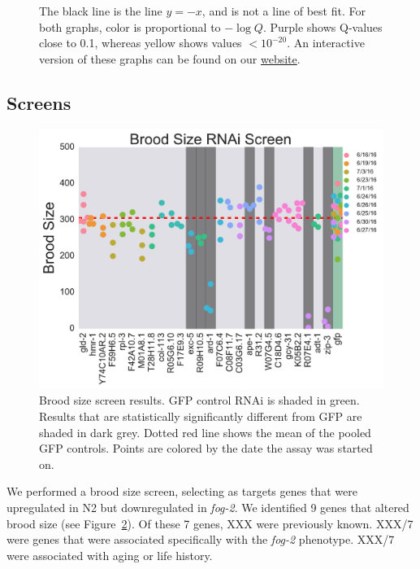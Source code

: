 \documentclass[9pt,twocolumn,twoside]{gsag3jnl}
\newcommand{\fog}{\emph{fog-2}}
\newcommand{\webref}{
\href{https://wormlabcaltech.github.io/Angeles_Leighton_2016/}{website}}
\begin{document}
\begin{figure}[htbp]
{The black line is the line $y=-x$, and is not a line of best fit. For both graphs, color is proportional to $-\log{Q}$. Purple shows Q-values close to 0.1, whereas yellow shows values $<10^{-20}$.
An interactive version of these graphs can be found on our \webref{}.
}%
\label{fig:aberrant_aging}
\end{figure}


\subsection*{Screens}
\label{subs:Screens}

\begin{figure}[htbp]
\renewcommand{\familydefault}{\sfdefault}\normalfont{}
\centering
\includegraphics[width=\linewidth]{../output/figs/final_figs/rnai_brood_assay_results.pdf}
\caption{Brood size screen results. GFP control RNAi is shaded in green. Results that are statistically significantly different from GFP are shaded in dark grey. Dotted red line shows the mean of the pooled GFP controls. Points are colored by the date the assay was started on.
}%
\label{fig:broodassay}
\end{figure}

We performed a brood size screen, selecting as targets genes that were upregulated in N2 but downregulated in \fog{}. We identified 9 genes that altered brood size (see Figure~\ref{fig:broodassay}). Of these 7 genes, XXX were previously known. XXX/7 were genes that were associated specifically with the \fog{} phenotype. XXX/7 were associated with aging or life history.
\end{document}
